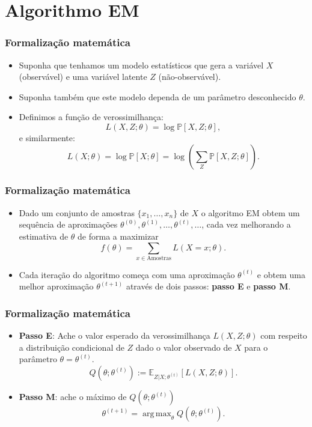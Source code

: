 \documentclass{beamer}
\newcommand{\Prob}{\mathbb{P}}
\newcommand{\E}{\mathbb{E}}
\newcommand{\rt}{\right}
\newcommand{\lt}{\left}
\DeclareMathOperator*{\argmax}{arg\,max}
\begin{document}
\section{Algorithmo EM}

\begin{frame}

	\frametitle{Formalização matemática}
	\begin{itemize}
		\item Suponha que tenhamos um modelo estatísticos que gera 
		a variável $X$ (observável) e uma variável latente $Z$ (não-observável).
		\pause
		\item Suponha também que este modelo dependa de um parâmetro
		desconhecido $\theta$. \pause
		\item Definimos a função de verossimilhança:
		\[
		 L(X,Z;\theta) = \log \Prob[X,Z;\theta],
		\]
		\pause
		e similarmente:
		\[
		L(X;\theta) = \log \Prob[X;\theta] = \log\lt(\sum_{Z}
		\Prob[X,Z;\theta]\rt).
		\]
	\end{itemize}

\end{frame}

\begin{frame}
	
	\frametitle{Formalização matemática}
	\begin{itemize}
	\item
	Dado um conjunto de amostras $\{x_1,\ldots, x_n\}$ de $X$
	o algoritmo EM obtem um sequência de aproximações $\theta^{(0)},
	\theta^{(1)},\ldots,\theta^{(t)},\ldots$, cada vez melhorando
	a estimativa de $\theta$ de forma a maximizar
	\[
	f(\theta) = \sum_{x\in\text{Amostras}} L(X=x;\theta).
	\]
	\pause
	\item Cada iteração do algoritmo começa com uma aproximação $\theta^{(t)}$
	e obtem uma melhor aproximação $\theta^{(t+1)}$ através de dois passos:
	\textbf{passo E} e \textbf{passo M}.
	\end{itemize}

\end{frame}

\begin{frame}
	
	\frametitle{Formalização matemática}
	\begin{itemize}
		\item
		\textbf{Passo E}: Ache o valor esperado da verossimilhança
		$L(X,Z;\theta)$ com respeito a distribuição condicional de $Z$ dado o
		valor observado de $X$ para o parâmetro $\theta = \theta^{(t)}$.
		\pause
		\[
		Q(\theta; \theta^{(t)}):= \E_{Z|X;\theta^{(t)}}\lt[
		L(X,Z;\theta)\rt].
		\]
		\pause
		\item
		\textbf{Passo M}: ache o máximo de $Q(\theta;\theta^{(t)})$
		\[
		  \theta^{(t+1)}=\argmax_{\theta} Q(\theta;\theta^{(t)}).
		\]
	\end{itemize}

\end{frame}
\end{document}
